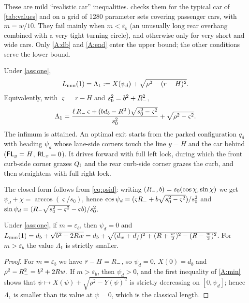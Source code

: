 These are mild ``realistic car'' inequalities.
 checks them for the typical car of \cref{tab:values} and on a grid of 1280 parameter sets covering passenger cars, with $m=w/10$.
They fail mainly when $m<\varepsilon_b$ (an unusually long rear overhang combined with a very tight turning circle), and otherwise only for very short and wide cars.
Only \ref{A:db} and \ref{A:end} enter the upper bound; the other conditions serve the lower bound.

\begin{theorem}\label{thm:one}
Under \cref{ass:one},
\begin{equation}\label{eq:Lambda1def}
  L_{\min}(1)=\Lambda_1:=X(\psi_d)+\sqrt{\rho^2-(r-H)^2}.
\end{equation}
Equivalently, with $\varsigma=r-H$ and $s_0^2=b^2+R_{-}^2$,
\[
  \Lambda_1=\frac{\ell\,R_{-}\,\varsigma+(bd_b-R_{-}^2)\sqrt{s_0^2-\varsigma^2}}{s_0^2}+\sqrt{\rho^2-\varsigma^2}.
\]
The infimum is attained.
An optimal exit starts from the parked configuration $q_d$ with heading $\psi_d$ whose lane-side corners touch the line $y=H$ and the car behind ($\mathsf{FL}_y=H$, $\mathsf{RL}_x=0$).
It drives forward with full left lock, during which the front curb-side corner grazes $Q_{\mathrm f}$ and the rear curb-side corner grazes the curb, and then straightens with full right lock.
\end{theorem}

The closed form follows from \eqref{eq:psid}: writing $(R_{-},b)=s_0(\cos\chi,\sin\chi)$ we get $\psi_d+\chi=\arccos(\varsigma/s_0)$, hence
$\cos\psi_d=(\varsigma R_{-}+b\sqrt{s_0^2-\varsigma^2})/s_0^2$ and $\sin\psi_d=(R_{-}\sqrt{s_0^2-\varsigma^2}-\varsigma b)/s_0^2$.

\begin{corollary}\label{cor:classical}
Under \cref{ass:one}, if $m=\varepsilon_b$, then $\psi_d=0$ and $L_{\min}(1)=d_b+\sqrt{b^2+2Rw}=d_b+\sqrt{(d_w+d_f)^2+(R+\tfrac w2)^2-(R-\tfrac w2)^2}$.
For $m>\varepsilon_b$ the value $\Lambda_1$ is strictly smaller.
\end{corollary}
\begin{proof}
For $m=\varepsilon_b$ we have $r-H=R_{-}$, so $\psi_d=0$, $X(0)=d_b$ and $\rho^2-R_{-}^2=b^2+2Rw$.
If $m>\varepsilon_b$, then $\psi_d>0$, and the first inequality of \ref{A:min} shows that $\psi\mapsto X(\psi)+\sqrt{\rho^2-Y(\psi)^2}$ is strictly decreasing on $[0,\psi_d]$; hence $\Lambda_1$ is smaller than its value at $\psi=0$, which is the classical length.
\end{proof}

